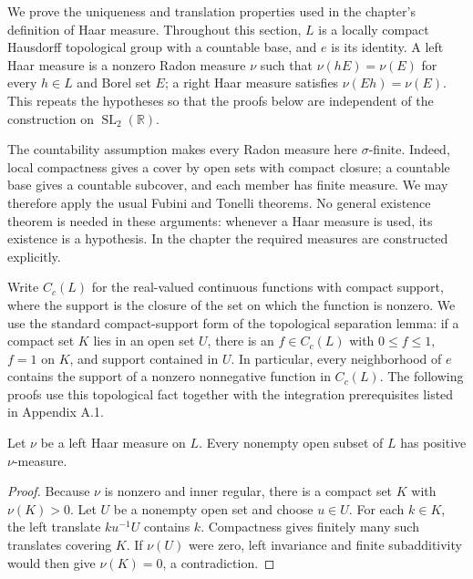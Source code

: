 We prove the uniqueness and translation properties used in the chapter's definition of Haar measure. Throughout this section, $L$ is a locally compact Hausdorff topological group with a countable base, and $e$ is its identity. A left Haar measure is a nonzero Radon measure $\nu$ such that $\nu(hE)=\nu(E)$ for every $h\in L$ and Borel set $E$; a right Haar measure satisfies $\nu(Eh)=\nu(E)$. This repeats the hypotheses so that the proofs below are independent of the construction on $\operatorname{SL}_2(\mathbb R)$.

The countability assumption makes every Radon measure here $\sigma$-finite. Indeed, local compactness gives a cover by open sets with compact closure; a countable base gives a countable subcover, and each member has finite measure. We may therefore apply the usual Fubini and Tonelli theorems. No general existence theorem is needed in these arguments: whenever a Haar measure is used, its existence is a hypothesis. In the chapter the required measures are constructed explicitly.

\label{measure.compact-support-functions}
Write $C_c(L)$ for the real-valued continuous functions with compact support, where the support is the closure of the set on which the function is nonzero. We use the standard compact-support form of the topological separation lemma: if a compact set $K$ lies in an open set $U$, there is an $f\in C_c(L)$ with $0\leq f\leq1$, $f=1$ on $K$, and support contained in $U$. In particular, every neighborhood of $e$ contains the support of a nonzero nonnegative function in $C_c(L)$. The following proofs use this topological fact together with the integration prerequisites listed in Appendix A.1.

\begin{lemma}\label{measure.haar-positive-open}
Let $\nu$ be a left Haar measure on $L$. Every nonempty open subset of $L$ has positive $\nu$-measure.
\end{lemma}

\begin{proof}
Because $\nu$ is nonzero and inner regular, there is a compact set $K$ with $\nu(K)>0$. Let $U$ be a nonempty open set and choose $u\in U$. For each $k\in K$, the left translate $ku^{-1}U$ contains $k$. Compactness gives finitely many such translates covering $K$. If $\nu(U)$ were zero, left invariance and finite subadditivity would then give $\nu(K)=0$, a contradiction.
\end{proof}

